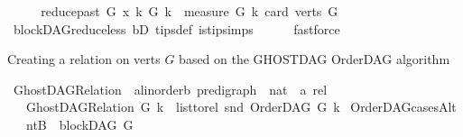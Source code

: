 \begin{isabellebody}
\ \ \isamarkupfalse%
\ \isamarkupfalse%
\ {\isachardoublequoteopen}{\isacharparenleft}{\kern0pt}{\isacharparenleft}{\kern0pt}reduce{\isacharunderscore}{\kern0pt}past\ G\ x{\isacharcomma}{\kern0pt}\ k{\isacharparenright}{\kern0pt}{\isacharcomma}{\kern0pt}\ G{\isacharcomma}{\kern0pt}\ k{\isacharparenright}{\kern0pt}\ {\isasymin}\ measure\ {\isacharparenleft}{\kern0pt}{\isasymlambda}{\isacharparenleft}{\kern0pt}G{\isacharcomma}{\kern0pt}\ k{\isacharparenright}{\kern0pt}{\isachardot}{\kern0pt}\ card\ {\isacharparenleft}{\kern0pt}verts\ G{\isacharparenright}{\kern0pt}{\isacharparenright}{\kern0pt}{\isachardoublequoteclose}\isanewline
\ \ \ \ \isamarkupfalse%
\ blockDAG{\isachardot}{\kern0pt}reduce{\isacharunderscore}{\kern0pt}less\ bD\ tips{\isacharunderscore}{\kern0pt}def\ is{\isacharunderscore}{\kern0pt}tip{\isachardot}{\kern0pt}simps\isanewline
\ \ \ \ \isamarkupfalse%
\ fastforce\ \ \isanewline
{}\isamarkupfalse%
%
\endisatagproof
{\isafoldproof}%
%
\isadelimproof
%
\endisadelimproof
%
\begin{isamarkuptext}%
Creating a relation on verts $G$ based on the GHOSTDAG OrderDAG algorithm%
\end{isamarkuptext}\isamarkuptrue%
\isamarkupfalse%
\ GhostDAG{\isacharunderscore}{\kern0pt}Relation\ {\isacharcolon}{\kern0pt}{\isacharcolon}{\kern0pt}\ {\isachardoublequoteopen}{\isacharparenleft}{\kern0pt}{\isacharprime}{\kern0pt}a{\isacharcolon}{\kern0pt}{\isacharcolon}{\kern0pt}linorder{\isacharcomma}{\kern0pt}{\isacharprime}{\kern0pt}b{\isacharparenright}{\kern0pt}\ pre{\isacharunderscore}{\kern0pt}digraph\ {\isasymRightarrow}\ nat\ {\isasymRightarrow}\ {\isacharprime}{\kern0pt}a\ rel{\isachardoublequoteclose}\isanewline
\ \ \ {\isachardoublequoteopen}GhostDAG{\isacharunderscore}{\kern0pt}Relation\ G\ k\ {\isacharequal}{\kern0pt}\ list{\isacharunderscore}{\kern0pt}to{\isacharunderscore}{\kern0pt}rel\ {\isacharparenleft}{\kern0pt}snd\ {\isacharparenleft}{\kern0pt}OrderDAG\ G\ k{\isacharparenright}{\kern0pt}{\isacharparenright}{\kern0pt}{\isachardoublequoteclose}%
\isadelimdocument
%
\endisadelimdocument
%
\isatagdocument
%
\isamarkuptrue%
%
\endisatagdocument
{\isafolddocument}%
%
\isadelimdocument
%
\endisadelimdocument
{}\isamarkupfalse%
\ OrderDAG{\isacharunderscore}{\kern0pt}casesAlt{\isacharcolon}{\kern0pt}\isanewline
\ \ \ {\isacharparenleft}{\kern0pt}ntB{\isacharparenright}{\kern0pt}\ {\isachardoublequoteopen}{\isasymnot}\ blockDAG\ G{\isachardoublequoteclose}\ \isanewline

\end{isabellebody}

